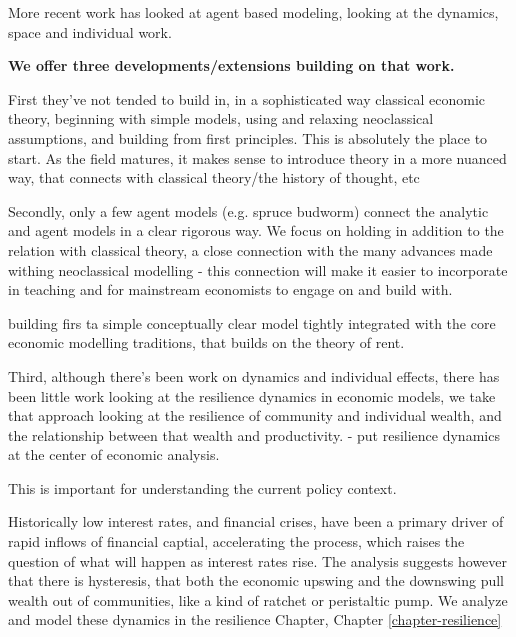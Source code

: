 More recent work has looked at agent based modeling, looking at the dynamics, space and individual work. 

\textbf{We offer three developments/extensions building on that work.}

First they've not tended to build in, in a sophisticated way classical economic theory, beginning with simple models, using and relaxing neoclassical assumptions, and building from first principles. This is absolutely the place to start. As the field matures, it makes sense to introduce theory in a more nuanced way, that connects with classical theory/the history of thought, etc

Secondly, only a few agent models (e.g. spruce budworm) connect the analytic and agent models in a clear rigorous way. We focus on holding in addition to the relation with classical theory, a close connection with the many advances made withing neoclassical modelling - this connection will make it easier to incorporate in teaching and for mainstream economists to engage on and build with.


building firs ta simple conceptually clear model tightly integrated with the core economic modelling traditions, that builds on the theory of rent.


Third, although there's been work on dynamics and individual effects, there has been little work looking at the resilience dynamics in economic models, we take that approach looking at the resilience of community and individual wealth, and the relationship between that wealth and productivity. - put resilience dynamics at the center of economic analysis.

This is important for understanding the current policy context. 

Historically low interest rates, and financial crises, have been a primary driver of rapid inflows of financial captial, accelerating the process, which raises the question of what will happen as interest rates rise. The analysis suggests however that there is hysteresis, that both the economic upswing and the downswing pull wealth out of communities, like a kind of ratchet or peristaltic pump. We analyze and model these dynamics in the resilience Chapter, Chapter \ref{chapter-resilience}



